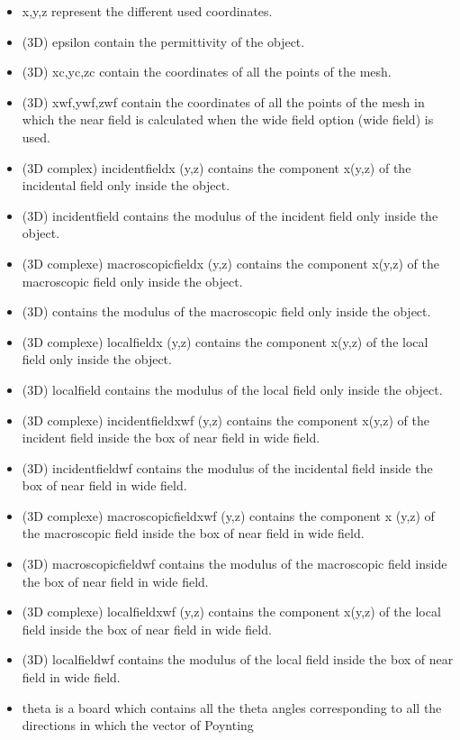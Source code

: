 \begin{itemize}
\item x,y,z represent the different used coordinates.
\item (3D) epsilon contain the permittivity of the object.
\item (3D) xc,yc,zc contain the coordinates of all the points of the
  mesh.
\item (3D) xwf,ywf,zwf contain the coordinates of all the points of
  the mesh in which the near field is calculated when the wide field
  option (wide field) is used.
\item (3D complex) incidentfieldx (y,z) contains the component x(y,z)
  of the incidental field only inside the object.
\item (3D) incidentfield contains the modulus of the incident field
  only inside the object.
\item (3D complexe) macroscopicfieldx (y,z) contains the component
  x(y,z) of the macroscopic field only inside the object.
\item (3D) contains the modulus of the macroscopic field only inside
  the object.
\item (3D complexe) localfieldx (y,z) contains the component x(y,z)
  of the local field only inside the object.
\item (3D) localfield contains the modulus of the local field only
  inside the object.
\item (3D complexe) incidentfieldxwf (y,z) contains the component
  x(y,z) of the incident field inside the box of near field in wide
  field.
\item (3D) incidentfieldwf contains the modulus of the incidental
  field inside the box of near field in wide field.
\item (3D complexe) macroscopicfieldxwf (y,z) contains the component
  x (y,z) of the macroscopic field inside the box of near field in wide
  field.
\item (3D) macroscopicfieldwf contains the modulus of the macroscopic
  field inside the box of near field in wide field.
\item (3D complexe) localfieldxwf (y,z) contains the component x(y,z)
  of the local field inside the box of near field in wide field.
\item (3D) localfieldwf contains the modulus of the local field inside
  the box of near field in wide field.
\item theta is a board which contains all the theta angles
  corresponding to all the directions in which the vector of Poynting

\end{itemize}
